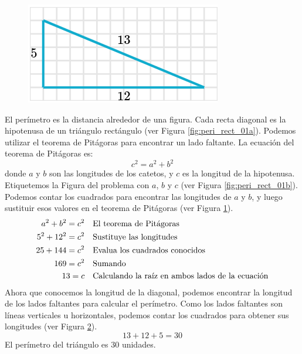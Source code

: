 \begin{solutionbox}{16cm}
\begin{minipage}{0.3\textwidth}
\begin{figure}[H]
            \caption{}
            \label{fig:peri_rect_01c}
        \end{figure}
        \begin{figure}[H]
            \centering
            \includegraphics[width=0.6\linewidth]{../images/peri_rect_01d.png}
            \caption{}
            \label{fig:peri_rect_01d}
        \end{figure}
    \end{minipage}\hfill
    \begin{minipage}{0.65\textwidth}
        El perímetro es la distancia alrededor de una figura.
        Cada recta diagonal es la hipotenusa de un triángulo rectángulo (ver Figura \ref{fig:peri_rect_01a}).
        Podemos utilizar el teorema de Pitágoras para encontrar un lado faltante.
        La ecuación del teorema de Pitágoras es:
        \[c^2=a^2+b^2\]
        donde $a$ y $b$ son las longitudes de los catetos, y $c$ es la longitud de la hipotenusa.
        Etiquetemos la Figura del problema con $a$, $b$ y $c$ (ver Figura \ref{fig:peri_rect_01b}).
        Podemos contar los cuadrados para encontrar las longitudes de $a$ y $b$, y luego sustituir esos valores en el teorema de Pitágoras (ver Figura \ref{fig:peri_rect_01c}).
        \begin{align*}
            a^2+b^2  =c^2  & \text{\quad El teorema de Pitágoras}                          \\
            5^2+12^2  =c^2 & \text{\quad Sustituye las longitudes}                         \\
            25 +144 =c^2   & \text{\quad Evalua los cuadrados conocidos}                   \\
            169=c^2        & \text{\quad Sumando }                                         \\
            13=c           & \text{\quad Calculando la raíz en ambos lados de la ecuación} \\
        \end{align*}
        Ahora que conocemos la longitud de la diagonal, podemos encontrar la longitud de los lados faltantes para calcular el perímetro.
        Como los lados faltantes son líneas verticales u horizontales, podemos contar los cuadrados para obtener sus longitudes (ver Figura \ref{fig:peri_rect_01d}).
        \[13+12+5=30\]
        El perímetro del triángulo es 30 unidades.
    \end{minipage}
\end{solutionbox}
